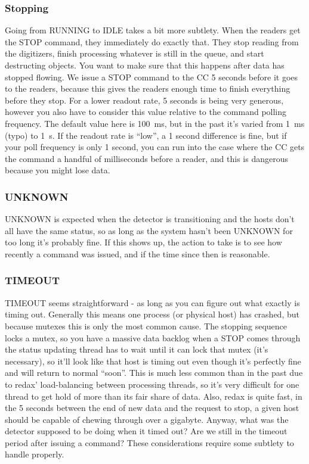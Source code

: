 \subsubsection{Stopping}

Going from RUNNING to IDLE takes a bit more subtlety.
When the readers get the STOP command, they immediately do exactly that.
They stop reading from the digitizers, finish processing whatever is still in the queue, and start destructing objects.
You want to make sure that this happens after data has stopped flowing.
We issue a STOP command to the CC 5 seconds before it goes to the readers, because this gives the readers enough time to finish everything before they stop.
For a lower readout rate, 5 seconds is being very generous, however you also have to consider this value relative to the command polling frequency.
The default value here is \SI{100}{\milli\second}, but in the past it's varied from \SI{1}{\milli\second} (typo) to \SI{1}{\second}.
If the readout rate is ``low'', a 1 second difference is fine, but if your poll frequency is only 1 second, you can run into the case where the CC gets the command a handful of milliseconds before a reader, and this is dangerous because you might lose data.

\subsubsection{UNKNOWN}

UNKNOWN is expected when the detector is transitioning and the hosts don't all have the same status, so as long as the system hasn't been UNKNOWN for too long it's probably fine.
If this shows up, the action to take is to see how recently a command was issued, and if the time since then is reasonable.

\subsubsection{TIMEOUT}

TIMEOUT seems straightforward - as long as you can figure out what exactly is timing out.
Generally this means one process (or physical host) has crashed, but because mutexes this is only the most common cause.
The stopping sequence locks a mutex, so you have a massive data backlog when a STOP comes through the status updating thread has to wait until it can lock that mutex (it's necessary), so it'll look like that host is timing out even though it's perfectly fine and will return to normal ``soon''.
This is much less common than in the past due to redax' load-balancing between processing threads, so it's very difficult for one thread to get hold of more than its fair share of data.
Also, redax is quite fast, in the 5 seconds between the end of new data and the request to stop, a given host should be capable of chewing through over a gigabyte.
Anyway, what was the detector supposed to be doing when it timed out?
Are we still in the timeout period after issuing a command?
These considerations require some subtlety to handle properly.


